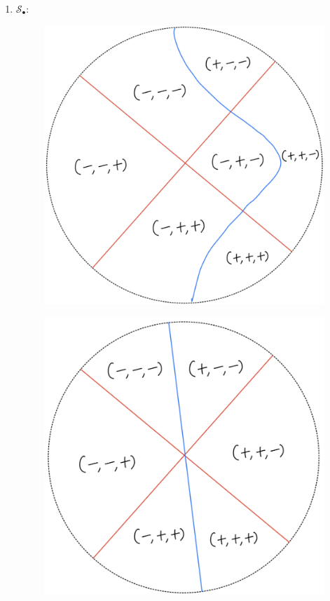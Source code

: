 \begin{definition}
\begin{enumerate}
\item $\mathcal{S}_\bullet$:
\begin{itemize}
\begin{figure}[H]
    \centering
    \includegraphics[scale = 0.95]{diagrams/lemma4/7.png}
    \caption{}
    \label{fig:your-label}
\end{figure}
\begin{figure}[H]
    \centering
    \includegraphics[scale = 0.95]{diagrams/lemma4/8.png}

\end{figure}
\end{itemize}
\end{enumerate}
\end{definition}
